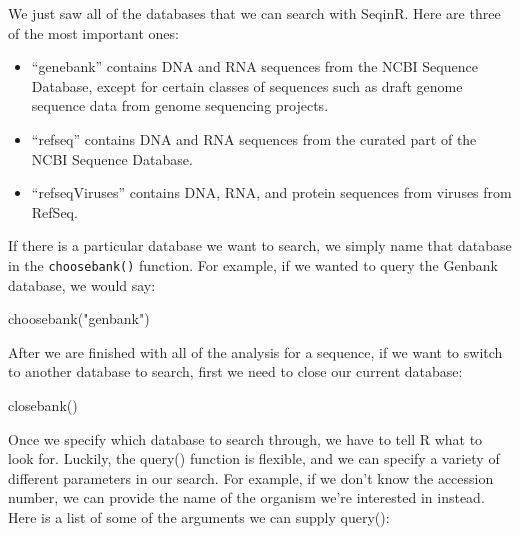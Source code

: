 \documentclass[
]{article}
\newenvironment{Shaded}{\begin{snugshade}}{\end{snugshade}}
\newcommand{\FunctionTok}[1]{\textcolor[rgb]{0.00,0.00,0.00}{#1}}
\newcommand{\NormalTok}[1]{#1}
\newcommand{\StringTok}[1]{\textcolor[rgb]{0.31,0.60,0.02}{#1}}
\providecommand{\tightlist}{%
  \setlength{\itemsep}{0pt}\setlength{\parskip}{0pt}}
\begin{document}
We just saw all of the databases that we can search with SeqinR. Here
are three of the most important ones:

\begin{itemize}
\tightlist
\item
  ``genebank'' contains DNA and RNA sequences from the NCBI Sequence
  Database, except for certain classes of sequences such as draft genome
  sequence data from genome sequencing projects.\\
\item
  ``refseq'' contains DNA and RNA sequences from the curated part of the
  NCBI Sequence Database.\\
\item
  ``refseqViruses'' contains DNA, RNA, and protein sequences from
  viruses from RefSeq.
\end{itemize}

If there is a particular database we want to search, we simply name that
database in the \texttt{choosebank()} function. For example, if we
wanted to query the Genbank database, we would say:

\begin{Shaded}
\begin{Highlighting}[]
\FunctionTok{choosebank}\NormalTok{(}\StringTok{"genbank"}\NormalTok{)}
\end{Highlighting}
\end{Shaded}

After we are finished with all of the analysis for a sequence, if we
want to switch to another database to search, first we need to close our
current database:

\begin{Shaded}
\begin{Highlighting}[]
\FunctionTok{closebank}\NormalTok{()}
\end{Highlighting}
\end{Shaded}

Once we specify which database to search through, we have to tell R what
to look for. Luckily, the query() function is flexible, and we can
specify a variety of different parameters in our search. For example, if
we don't know the accession number, we can provide the name of the
organism we're interested in instead. Here is a list of some of the
arguments we can supply query():
\end{document}
